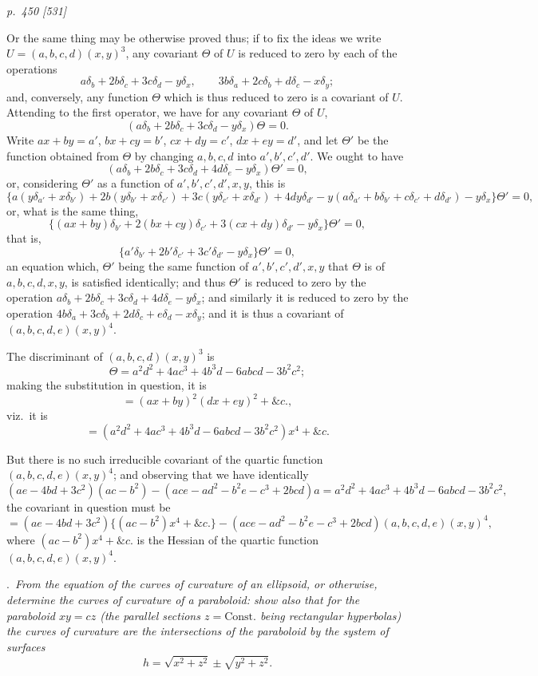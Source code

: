 \documentclass[11pt,a4paper]{article}
\theoremstyle{plain}
\theoremstyle{definition}
\begin{document}
\clearpage

\bigskip
\textit{p.~450 [531]}
\smallskip

Or the same thing may be otherwise proved thus; if to fix the ideas we write
$U=(a,b,c,d)(x,y)^3$, any covariant $\Theta$ of $U$ is reduced to zero by each of the
operations
\[
a\delta_b+2b\delta_c+3c\delta_d-y\delta_x,\qquad
3b\delta_a+2c\delta_b+d\delta_c-x\delta_y;
\]
and, conversely, any function $\Theta$ which is thus reduced to zero is a covariant of
$U$. Attending to the first operator, we have for any covariant $\Theta$ of $U$,
\[
(a\delta_b+2b\delta_c+3c\delta_d-y\delta_x)\Theta=0.
\]
Write $ax+by=a'$, $bx+cy=b'$, $cx+dy=c'$, $dx+ey=d'$, and let $\Theta'$ be the function
obtained from $\Theta$ by changing $a,b,c,d$ into $a',b',c',d'$. We ought to have
\[
(a\delta_b+2b\delta_c+3c\delta_d+4d\delta_e-y\delta_x)\Theta'=0,
\]
or, considering $\Theta'$ as a function of $a',b',c',d',x,y$, this is
\[
\{a(y\delta_{a'}+x\delta_{b'})
+2b(y\delta_{b'}+x\delta_{c'})
+3c(y\delta_{c'}+x\delta_{d'})
+4dy\delta_{d'}
-y(a\delta_{a'}+b\delta_{b'}+c\delta_{c'}+d\delta_{d'})
-y\delta_x\}\Theta'=0,
\]
or, what is the same thing,
\[
\{(ax+by)\delta_{b'}+2(bx+cy)\delta_{c'}+3(cx+dy)\delta_{d'}-y\delta_x\}\Theta'=0,
\]
that is,
\[
\{a'\delta_{b'}+2b'\delta_{c'}+3c'\delta_{d'}-y\delta_x\}\Theta'=0,
\]
an equation which, $\Theta'$ being the same function of $a',b',c',d',x,y$ that $\Theta$ is of
$a,b,c,d,x,y$, is satisfied identically; and thus $\Theta'$ is reduced to zero by the operation
$a\delta_b+2b\delta_c+3c\delta_d+4d\delta_e-y\delta_x$; and similarly it is reduced to zero
by the operation $4b\delta_a+3c\delta_b+2d\delta_c+e\delta_d-x\delta_y$; and it is thus a
covariant of $(a,b,c,d,e)(x,y)^4$.

The discriminant of $(a, b, c, d)(x, y)^3$ is
\[
\Theta = a^2d^2+4ac^3+4b^3d-6abcd-3b^2c^2;
\]
making the substitution in question, it is
\[
=(ax+by)^2(dx+ey)^2+\&c.,
\]
viz.\ it is
\[
=(a^2d^2+4ac^3+4b^3d-6abcd-3b^2c^2)x^4+\&c.
\]

But there is no such irreducible covariant of the quartic function $(a, b, c, d, e)(x, y)^4$;
and observing that we have identically
\[
(ae-4bd+3c^2)(ac-b^2)-(ace-ad^2-b^2e-c^3+2bcd)a
=a^2d^2+4ac^3+4b^3d-6abcd-3b^2c^2,
\]
the covariant in question must be
\[
=(ae-4bd+3c^2)\{(ac-b^2)x^4+\&c.\}
-(ace-ad^2-b^2e-c^3+2bcd)(a,b,c,d,e)(x,y)^4,
\]
where $(ac-b^2)x^4+\&c.$ is the Hessian of the quartic function $(a,b,c,d,e)(x,y)^4$.

\medskip
{}.\ \textit{From the equation of the curves of curvature of an ellipsoid, or otherwise,
determine the curves of curvature of a paraboloid: show also that for the paraboloid $xy=cz$
(the parallel sections $z=\mathrm{Const.}$ being rectangular hyperbolas) the curves of curvature are
the intersections of the paraboloid by the system of surfaces}
\[
h=\sqrt{x^2+z^2}\pm\sqrt{y^2+z^2}.
\]
\end{document}
